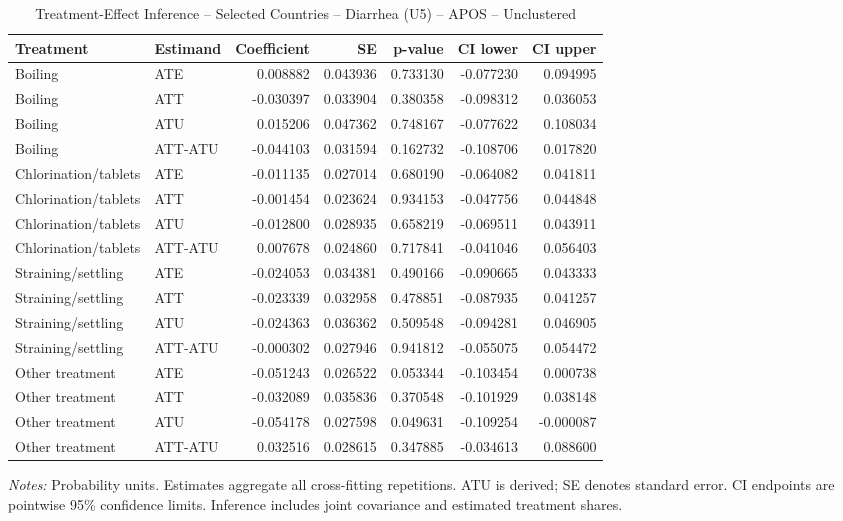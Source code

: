 \begin{table}[htbp]
\centering
\caption{Treatment-Effect Inference -- Selected Countries -- Diarrhea (U5) -- APOS -- Unclustered}
\label{tab:inference-diarrhea-APOS-iid-selected-countries}
\scriptsize
\begin{adjustbox}{max width=\linewidth}
\begin{tabular}{llrrrrr}
\toprule
Treatment & Estimand & Coefficient & SE & p-value & CI lower & CI upper \\
\midrule
Boiling & ATE & 0.008882 & 0.043936 & 0.733130 & -0.077230 & 0.094995 \\
Boiling & ATT & -0.030397 & 0.033904 & 0.380358 & -0.098312 & 0.036053 \\
Boiling & ATU & 0.015206 & 0.047362 & 0.748167 & -0.077622 & 0.108034 \\
Boiling & ATT-ATU & -0.044103 & 0.031594 & 0.162732 & -0.108706 & 0.017820 \\
Chlorination/tablets & ATE & -0.011135 & 0.027014 & 0.680190 & -0.064082 & 0.041811 \\
Chlorination/tablets & ATT & -0.001454 & 0.023624 & 0.934153 & -0.047756 & 0.044848 \\
Chlorination/tablets & ATU & -0.012800 & 0.028935 & 0.658219 & -0.069511 & 0.043911 \\
Chlorination/tablets & ATT-ATU & 0.007678 & 0.024860 & 0.717841 & -0.041046 & 0.056403 \\
Straining/settling & ATE & -0.024053 & 0.034381 & 0.490166 & -0.090665 & 0.043333 \\
Straining/settling & ATT & -0.023339 & 0.032958 & 0.478851 & -0.087935 & 0.041257 \\
Straining/settling & ATU & -0.024363 & 0.036362 & 0.509548 & -0.094281 & 0.046905 \\
Straining/settling & ATT-ATU & -0.000302 & 0.027946 & 0.941812 & -0.055075 & 0.054472 \\
Other treatment & ATE & -0.051243 & 0.026522 & 0.053344 & -0.103454 & 0.000738 \\
Other treatment & ATT & -0.032089 & 0.035836 & 0.370548 & -0.101929 & 0.038148 \\
Other treatment & ATU & -0.054178 & 0.027598 & 0.049631 & -0.109254 & -0.000087 \\
Other treatment & ATT-ATU & 0.032516 & 0.028615 & 0.347885 & -0.034613 & 0.088600 \\
\bottomrule
\end{tabular}

\end{adjustbox}
\par\smallskip
\begin{minipage}{\linewidth}\scriptsize \textit{Notes:} Probability units. Estimates aggregate all cross-fitting repetitions. ATU is derived; SE denotes standard error. CI endpoints are pointwise 95\% confidence limits. Inference includes joint covariance and estimated treatment shares. \end{minipage}
\end{table}
